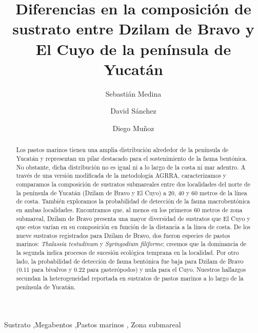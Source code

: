 \documentclass[
  authoryear,
  preprint,
  3p,
  twocolumn]{elsarticle}
\begin{document}
\begin{frontmatter}
\title{Diferencias en la composición de sustrato entre Dzilam de Bravo y
El Cuyo de la península de Yucatán}
\author[1]{Sebastián Medina%
%
}
\author[1]{David Sánchez%
%
}
\author[1]{Diego Muñoz%
%
}





        
\begin{abstract}
Los pastos marinos tienen una amplia distribución alrededor de la
península de Yucatán y representan un pilar destacado para el
sostenimiento de la fauna bentónica. No obstante, dicha distribución no
es igual ni a lo largo de la costa ni mar adentro. A través de una
versión modificada de la metodología AGRRA, caracterizamos y comparamos
la composición de sustratos submareales entre dos localidades del norte
de la península de Yucatán (Dzilam de Bravo y El Cuyo) a 20, 40 y 60
metros de la línea de costa. También exploramos la probabilidad de
detección de la fauna macrobentónica en ambas localidades. Encontramos
que, al menos en los primeros 60 metros de zona submareal, Dzilam de
Bravo presenta una mayor diversidad de sustratos que El Cuyo y que estos
varían en su composición en función de la distancia a la línea de costa.
De los nueve sustratos registrados para Dzilam de Bravo, dos fueron
especies de pastos marinos: \emph{Thalassia testudinum} y
\emph{Syringodium filiforme}; creemos que la dominancia de la segunda
indica procesos de sucesión ecológica temprana en la localidad. Por otro
lado, la probabilidad de detección de fauna bentónica fue baja para
Dzilam de Bravo (0.11 para bivalvos y 0.22 para gasterópodos) y nula
para el Cuyo. Nuestros hallazgos secundan la heterogeneidad reportada en
sustratos de pastos marinos a lo largo de la península de Yucatán.
\end{abstract}





\begin{keyword}
    Sustrato \sep Megabentos \sep Pastos marinos \sep 
    Zona submareal
\end{keyword}
\end{frontmatter}
    \ifdefined\Shaded\renewenvironment{Shaded}{\begin{tcolorbox}[sharp corners, frame hidden, boxrule=0pt, borderline west={3pt}{0pt}{shadecolor}, enhanced, interior hidden, breakable]}{\end{tcolorbox}}\fi
\end{document}

